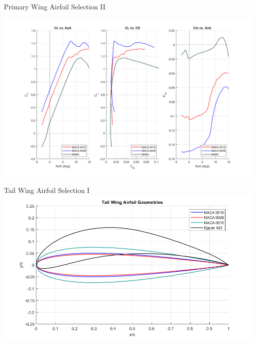 \documentclass{beamer}
\begin{document}
    \begin{frame}{Primary Wing Airfoil Selection II}

        \centering
        \includegraphics[width=\textwidth]{figures/primarywingplots.png}
    \end{frame}
    
    \begin{frame}{Tail Wing Airfoil Selection I}
        \centering
         \includegraphics[width=\textwidth]{figures/tailfoils.png}
    \end{frame}
        
\end{document}
